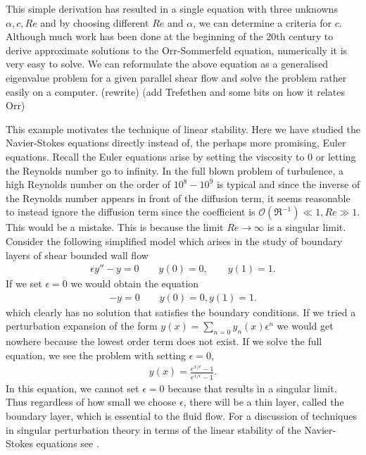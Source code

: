 This simple derivation has resulted in a single equation with three unknowns $\alpha,c,Re$ and by choosing different $Re$ and $\alpha$, we can determine a criteria for $c$. Although much work has been done at the beginning of the 20th century to derive approximate solutions to the Orr-Sommerfeld equation, numerically it is very easy to solve. We can reformulate the above equation as a generalised eigenvalue problem for a given parallel shear flow and solve the problem rather easily on a computer. (rewrite) (add Trefethen and some bits on how it relates Orr)

This example motivates the technique of linear stability. Here we have studied the Navier-Stokes equations directly instead of, the perhaps more promising, Euler equations. Recall the Euler equations arise by setting the viscosity to $0$ or letting the Reynolds number go to infinity. In the full blown problem of turbulence, a high Reynolds number on the order of $10^{8}-10^{9}$ is typical and since the inverse of the Reynolds number appears in front of the diffusion term, it seems reasonable to instead ignore the diffusion term since the coefficient is $\mathcal{O}(\Re^{-1}) \ll 1, Re\gg 1$. This would be a mistake. This is because the limit $Re\rightarrow\infty$ is a singular limit. Consider the following simplified model which arises in the study of boundary layers of shear bounded wall flow\cite{benderorszag,acheson_fluid,kundu}
\begin{align}
\epsilon y'' - y =0 \qquad y(0)=0,\qquad y(1)=1.
\end{align}
If we set $\epsilon=0$ we would obtain the equation 
\begin{align}
- y =0 \qquad y(0)=0,y(1)=1.
\end{align}
which clearly has no solution that satisfies the boundary conditions. If we tried a perturbation expansion of the form $y(x) =\sum_{n=0}y_{n}(x)\epsilon^{n}$ we would get nowhere because the lowest order term does not exist. If we solve the full equation, we see the problem with setting $\epsilon=0$,
\begin{align}
y(x) = \frac{e^{x/\epsilon}-1}{e^{1/\epsilon}-1}.
\end{align}
In this equation, we cannot set $\epsilon=0$ because that results in a singular limit. Thus regardless of how small we choose $\epsilon$, there will be a thin layer, called the boundary layer, which is essential to the fluid flow. For a discussion of techniques in singular perturbation theory in terms of the linear stability of the Navier-Stokes equations see \cite{drazinreid}.


